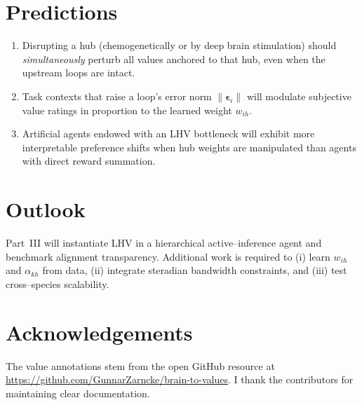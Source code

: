 \documentclass[11pt]{article}
\begin{document}
\section{Predictions}
\begin{enumerate}
  \item Disrupting a hub (chemogenetically or by deep brain stimulation) should \emph{simultaneously} perturb all values anchored to that hub, even when the upstream loops are intact.
  \item Task contexts that raise a loop's error norm $\lVert \boldsymbol{\epsilon}_i \rVert$ will modulate subjective value ratings in proportion to the learned weight $w_{ih}$.
  \item Artificial agents endowed with an LHV bottleneck will exhibit more interpretable preference shifts when hub weights are manipulated than agents with direct reward summation.
\end{enumerate}

\section{Outlook}
Part~III will instantiate LHV in a hierarchical active--inference agent and benchmark alignment transparency.  Additional work is required to (i) learn $w_{ih}$ and $\alpha_{kh}$ from data, (ii) integrate steradian bandwidth constraints, and (iii) test cross--species scalability.

\section*{Acknowledgements}
The value annotations stem from the open GitHub resource at \url{https://github.com/GunnarZarncke/brain-to-values}.  I thank the contributors for maintaining clear documentation.
\end{document}
